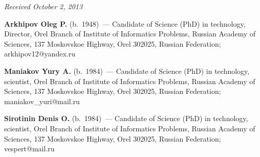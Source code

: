\vspace*{-6pt}

\hfill{\small\textit{Received October 2, 2013}}

\vspace*{-18pt}

\Contr

\noindent
\textbf{Arkhipov Oleg P.} (b.\ 1948)~--- Candidate of Science (PhD) in technology,
Director, Orel Branch of Institute of Informatics Problems, Russian
Academy of Sciences, 137 Moskovskoe Highway, Orel 302025, Russian Federation;
arkhipov12@yandex.ru


\vspace*{3pt}

\noindent
\textbf{Maniakov Yury A.} (b.\ 1984)~--- Candidate of Science (PhD) 
in technology,
scientist, Orel Branch of Institute of Informatics Problems, Russian
Academy of Sciences, 137 Moskovskoe Highway, Orel 302025, Russian Federation;
maniakov\_yuri@mail.ru

\vspace*{3pt}

\noindent
\textbf{Sirotinin Denis O.} (b.\ 1984)~--- Candidate of Science (PhD) 
in technology, scientist, Orel Branch of Institute of Informatics Problems, Russian
Academy of Sciences, 137 Moskovskoe Highway, Orel 302025, Russian Federation;
vespert@mail.ru


 \label{end\stat}
 
\renewcommand{\bibname}{\protect\rm Литература}



  